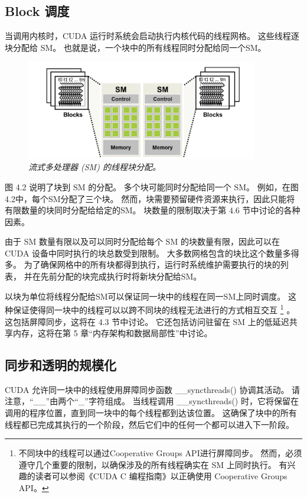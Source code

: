 \subsection{Block 调度}
当调用内核时，CUDA 运行时系统会启动执行内核代码的线程网格。 这些线程逐块分配给 SM。 
也就是说，一个块中的所有线程同时分配给同一个SM。

\begin{figure}[H]
	\centering
	\includegraphics[width=0.9\textwidth]{figs/F4.2.png}
	\caption{\textit{流式多处理器 (SM) 的线程块分配。}}
\end{figure}

图 4.2 说明了块到 SM 的分配。 多个块可能同时分配给同一个 SM。 例如，在图4.2中，每个SM分配了三个块。 
然而，块需要预留硬件资源来执行，因此只能将有限数量的块同时分配给给定的SM。 块数量的限制取决于第 4.6 节中讨论的各种因素。

由于 SM 数量有限以及可以同时分配给每个 SM 的块数量有限，因此可以在 CUDA 设备中同时执行的块总数受到限制。 
大多数网格包含的块比这个数量多得多。 为了确保网格中的所有块都得到执行，运行时系统维护需要执行的块的列表，
并在先前分配的块完成执行时将新块分配给SM。

以块为单位将线程分配给SM可以保证同一块中的线程在同一SM上同时调度。 
这种保证使得同一块中的线程可以以跨不同块的线程无法进行的方式相互交互
\footnote{不同块中的线程可以通过Cooperative Groups API进行屏障同步。 
然而，必须遵守几个重要的限制，以确保涉及的所有线程确实在 SM 上同时执行。 
有兴趣的读者可以参阅《CUDA C 编程指南》以正确使用 Cooperative Groups API。} 。
这包括屏障同步，这将在 4.3 节中讨论。 
它还包括访问驻留在 SM 上的低延迟共享内存，这将在第 5 章“内存架构和数据局部性”中讨论。

\subsection{同步和透明的规模化}
CUDA 允许同一块中的线程使用屏障同步函数 \_\_syncthreads() 协调其活动。 请注意，“\_\_”由两个“\_”字符组成。 
当线程调用 \_\_syncthreads() 时，它将保留在调用的程序位置，直到同一块中的每个线程都到达该位置。 
这确保了块中的所有线程都已完成其执行的一个阶段，然后它们中的任何一个都可以进入下一阶段。

